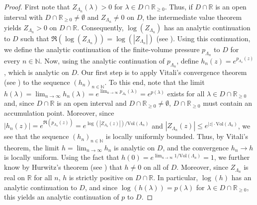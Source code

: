 \documentclass[10pt]{amsart}
\theoremstyle{definition}
\theoremstyle{remark}
\newcommand{\N}{\mathbb{N}}
\newcommand{\R}{\mathbb{R}}
\newcommand{\region}{\Lambda}
\newcommand{\activity}{\lambda}
\newcommand{\vol}{\mathrm{Vol}}
\newcommand{\absolute}[1]{\left\lvert#1\right\rvert}
\begin{document}
	\begin{proof}
		First note that $Z_{\region_n}(\activity) > 0$ for $\activity \in D \cap \R_{\ge 0}$. 
		Thus, if $D \cap \R$ is an open interval with $D \cap \R_{\ge 0} \neq \emptyset$ and $Z_{\region_n} \neq 0$ on $D$, the intermediate value theorem yields $Z_{\region_n} > 0$ on $D \cap \R$.
		Consequently, $\log(Z_{\region_n})$  has an analytic continuation to $D$ such that $\Re(\log(Z_{\region_n})) = \log(\absolute{Z_{\region_n}})$ (see \cite[Theorem B.23 \& Remark B.24]{friedli2017statistical}).
		Using this continuation, we define the analytic continuation of the finite-volume pressure $p_{\region_n}$ to $D$ for every $n \in \N$.
		Now, using the analytic continuation of $p_{\region_n}$, define $h_n (z) = e^{p_{\region_n}(z)}$, which is analytic on $D$.
		Our first step is to apply Vitali's convergence theorem (see \cite[Theorem B.25]{friedli2017statistical}) to the sequence $(h_n)_{n \in \N}$.
		To this end, note that the limit $h(\lambda) = \lim_{n \to \infty} h_n (\lambda) = e^{\lim_{n \to \infty} p_{\region_n}(\lambda)} = e^{p(\lambda)}$ exists for all $\lambda \in D \cap \R_{\ge 0}$ and, since $D \cap \R$ is an open interval and $D \cap \R_{\ge 0} \neq \emptyset$, $D \cap \R_{\ge 0}$ must contain an accumulation point.
		Moreover, since $\absolute{h_n(z)} = e^{\Re(p_{\region_n}(z))} = e^{\log(\absolute{Z_{\region_n}(z)})/\vol(\region_n)}$ and $\absolute{Z_{\region_n}(z)} \le e^{\absolute{z} \cdot \vol(\region_n)}$, we see that the sequence $(h_n)_{n \in \N}$ is locally uniformly bounded.
		Thus, by Vitali's theorem, the limit $h = \lim_{n \to \infty} h_n$ is analytic on $D$, and the convergence $h_n \to h$ is locally uniform.
		Using the fact that $h(0) = e^{\lim_{n \to \infty} 1/\vol(\region_n)} = 1$, we further know by Hurwitz's theorem (see \cite[Theorem B.26]{friedli2017statistical}) that $h \neq 0$ on all of $D$.
		Moreover, since $Z_{\region_n}$ is real on $\R$ for all $n$, $h$ is strictly positive on $D \cap \R$. 
		In particular, $\log(h)$ has an analytic continuation to $D$, and since $\log(h(\lambda)) = p(\lambda)$ for $\lambda \in D \cap \R_{\ge 0}$, this yields an analytic continuation of $p$ to $D$.
	\end{proof}
	
\end{document}
